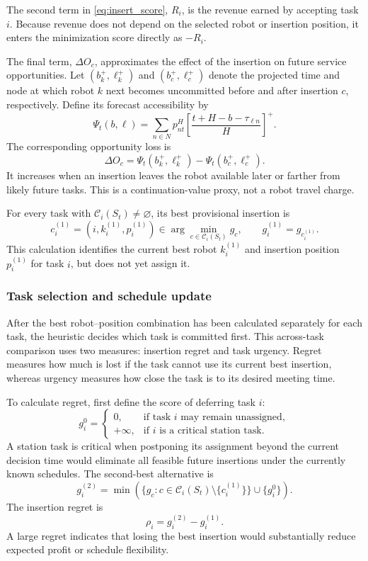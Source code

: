 \documentclass[11pt,oneside]{article}
\begin{document}
The second term in \eqref{eq:insert_score}, \(R_i\), is the revenue earned by accepting task \(i\). Because
revenue does not depend on the selected robot or insertion position, it enters
the minimization score directly as \(-R_i\).

The final term, \(\Delta O_c\), approximates the effect of the insertion on
future service opportunities. Let
\((b_k^+,\ell_k^+)\) and \((b_c^+,\ell_c^+)\) denote the projected time and
node at which robot \(k\) next becomes uncommitted before and after insertion
\(c\), respectively. Define its forecast accessibility by
\[
\Psi_t(b,\ell)
=
\sum_{n\in N}p_{nt}^H
\left[
\frac{t+H-b-\tau_{\ell n}}{H}
\right]^+.
\]
The corresponding opportunity loss is
\[
\Delta O_c
=
\Psi_t(b_k^+,\ell_k^+)-\Psi_t(b_c^+,\ell_c^+).
\]
It increases when an insertion leaves the robot available later or farther
from likely future tasks. This is a continuation-value proxy, not a robot
travel charge.

For every task with \(\mathcal C_i(S_t)\neq\varnothing\), its best provisional
insertion is
\[
c_i^{(1)}
=
\left(i,k_i^{(1)},p_i^{(1)}\right)
\in
\arg\min_{c\in\mathcal C_i(S_t)}g_c,
\qquad
g_i^{(1)}=g_{c_i^{(1)}}.
\]
This calculation identifies the current best robot \(k_i^{(1)}\) and
insertion position \(p_i^{(1)}\) for task \(i\), but does not yet assign it.

\subsubsection{Task selection and schedule update}

After the best robot--position combination has been calculated separately for
each task, the heuristic decides which task is committed first. This
across-task comparison uses two measures: insertion regret and task urgency.
Regret measures how much is lost if the task cannot use its current best
insertion, whereas urgency measures how close the task is to its desired
meeting time.

To calculate regret, first define the score of deferring task \(i\):
\[
g_i^0
=
\begin{cases}
0, & \text{if task \(i\) may remain unassigned},\\
+\infty, & \text{if \(i\) is a critical station task}.
\end{cases}
\]
A station task is critical when postponing its assignment beyond the current
decision time would eliminate all feasible future insertions under the
currently known schedules. The second-best alternative is
\[
g_i^{(2)}
=
\min\!\left(
\{g_c:c\in\mathcal C_i(S_t)\setminus\{c_i^{(1)}\}\}
\cup\{g_i^0\}
\right).
\]
The insertion regret is
\[
\rho_i=g_i^{(2)}-g_i^{(1)}.
\]
A large regret indicates that losing the best insertion would substantially
reduce expected profit or schedule flexibility.
\end{document}
